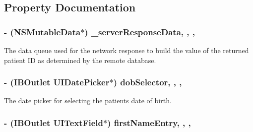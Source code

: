 \subsection{Property Documentation}
\hypertarget{interface_patient_information_v_c_a17cd9e90386e04e545017658bf34582e}{
\subsubsection[{\-\_\-server\-Response\-Data}]{\setlength{\rightskip}{0pt plus 5cm}-\/ (N\-S\-Mutable\-Data$\ast$) \-\_\-server\-Response\-Data\hspace{0.3cm}{\ttfamily [read]}, {\ttfamily [write]}, {\ttfamily [atomic]}, {\ttfamily [retain]}}}\label{interface_patient_information_v_c_a17cd9e90386e04e545017658bf34582e}
The data queue used for the network response to build the value of the returned patient I\-D as determined by the remote database. \hypertarget{interface_patient_information_v_c_a939dda6df517b4b5a4624928c77fe5b8}{
\subsubsection[{dob\-Selector}]{\setlength{\rightskip}{0pt plus 5cm}-\/ (I\-B\-Outlet U\-I\-Date\-Picker$\ast$) dob\-Selector\hspace{0.3cm}{\ttfamily [read]}, {\ttfamily [write]}, {\ttfamily [nonatomic]}, {\ttfamily [retain]}}}\label{interface_patient_information_v_c_a939dda6df517b4b5a4624928c77fe5b8}
The date picker for selecting the patients date of birth. \hypertarget{interface_patient_information_v_c_a1836a8d8dc5e1a376109fb8b391c4038}{
\subsubsection[{first\-Name\-Entry}]{\setlength{\rightskip}{0pt plus 5cm}-\/ (I\-B\-Outlet U\-I\-Text\-Field$\ast$) first\-Name\-Entry\hspace{0.3cm}{\ttfamily [read]}, {\ttfamily [write]}, {\ttfamily [nonatomic]}, {\ttfamily [retain]}}}\label{interface_patient_information_v_c_a1836a8d8dc5e1a376109fb8b391c4038}
